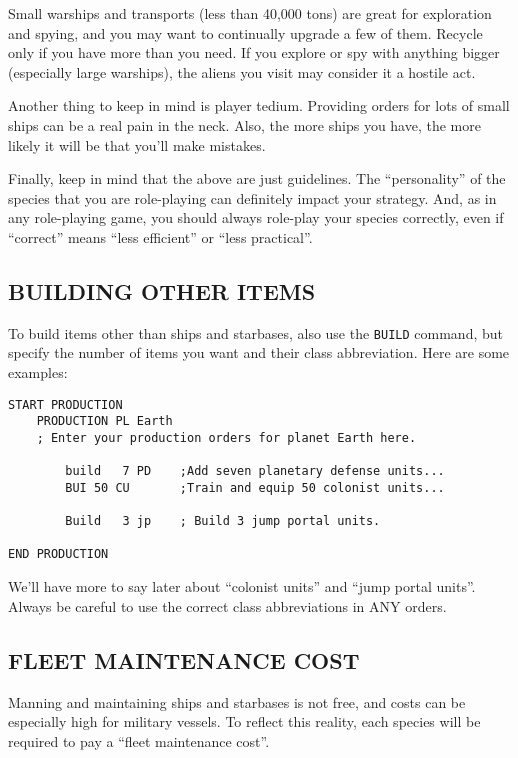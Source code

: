 \documentclass[10pt,titlepage]{article}
\begin{document}
Small warships and transports (less than 40,000 tons) are great for exploration
and spying, and you may want to continually upgrade a few of them.  Recycle
only if you have more than you need.  If you explore or spy with anything
bigger (especially large warships), the aliens you visit may consider it a
hostile act.

Another thing to keep in mind is player tedium.  Providing orders for lots of
small ships can be a real pain in the neck.  Also, the more ships you have, the
more likely it will be that you'll make mistakes.

Finally, keep in mind that the above are just guidelines.  The ``personality''
of the species that you are role-playing can definitely impact your strategy.
And, as in any role-playing game, you should always role-play your species
correctly, even if ``correct'' means ``less efficient'' or ``less practical''.


\subsection{BUILDING OTHER ITEMS}
\label{sec:buildingotheritems}


To build items other than ships and starbases, also use the \texttt{BUILD} command, but
specify the number of items you want and their class abbreviation.  Here are
some examples:

\begin{verbatim}
START PRODUCTION
    PRODUCTION PL Earth
    ; Enter your production orders for planet Earth here.

        build   7 PD    ;Add seven planetary defense units...
        BUI 50 CU       ;Train and equip 50 colonist units...

        Build   3 jp    ; Build 3 jump portal units.

END PRODUCTION
\end{verbatim} 

We'll have more to say later about ``colonist units'' and ``jump portal units''.
Always be careful to use the correct class abbreviations in ANY orders.


\subsection{FLEET MAINTENANCE COST}
\label{sec:fleetmaintenancecost}


Manning and maintaining ships and starbases is not free, and costs can be
especially high for military vessels.  To reflect this reality, each species
will be required to pay a ``fleet maintenance cost''.
\end{document}
